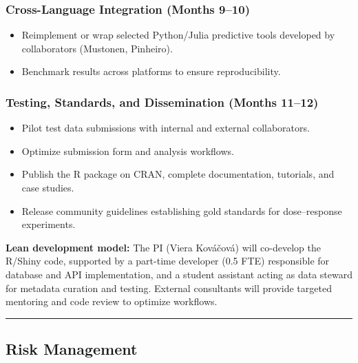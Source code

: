 \documentclass[
]{article}
\providecommand{\tightlist}{%
  \setlength{\itemsep}{0pt}\setlength{\parskip}{0pt}}
\begin{document}
\subsubsection{Cross-Language Integration (Months
9--10)}\label{cross-language-integration-months-910}

\begin{itemize}
\tightlist
\item
  Reimplement or wrap selected Python/Julia predictive tools developed
  by collaborators (Mustonen, Pinheiro).
\item
  Benchmark results across platforms to ensure reproducibility.
\end{itemize}

\subsubsection{Testing, Standards, and Dissemination (Months
11--12)}\label{testing-standards-and-dissemination-months-1112}

\begin{itemize}
\tightlist
\item
  Pilot test data submissions with internal and external collaborators.
\item
  Optimize submission form and analysis workflows.
\item
  Publish the R package on CRAN, complete documentation, tutorials, and
  case studies.
\item
  Release community guidelines establishing gold standards for
  dose--response experiments.
\end{itemize}

\textbf{Lean development model:} The PI (Viera Kováčová) will co-develop
the R/Shiny code, supported by a part-time developer (0.5 FTE)
responsible for database and API implementation, and a student assistant
acting as data steward for metadata curation and testing. External
consultants will provide targeted mentoring and code review to optimize
workflows.

\begin{center}\rule{0.5\linewidth}{0.5pt}\end{center}

\subsection{Risk Management}\label{risk-management}
\end{document}
